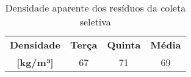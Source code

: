 \begin{table}[htbp]
  \centering
  \caption{Densidade aparente dos resíduos da coleta seletiva}
    \begin{tabular}{c|c|c|c}
    \rowcolor[rgb]{ .969,  .588,  .275} \textcolor[rgb]{ 1,  1,  1}{\textbf{Densidade}} & \textcolor[rgb]{ 1,  1,  1}{\textbf{Terça}} & \textcolor[rgb]{ 1,  1,  1}{\textbf{Quinta}} & \textcolor[rgb]{ 1,  1,  1}{\textbf{Média}} \\
    \rowcolor[rgb]{ .969,  .588,  .275} \textcolor[rgb]{ 1,  1,  1}{\textbf{[kg/m³]}} & \cellcolor[rgb]{ .984,  .831,  .706}67 & \cellcolor[rgb]{ .984,  .831,  .706}71 & \cellcolor[rgb]{ .984,  .831,  .706}69 \\
    \end{tabular}%
  \label{tab:densidade_aparente_seletiva}%
\end{table}%
